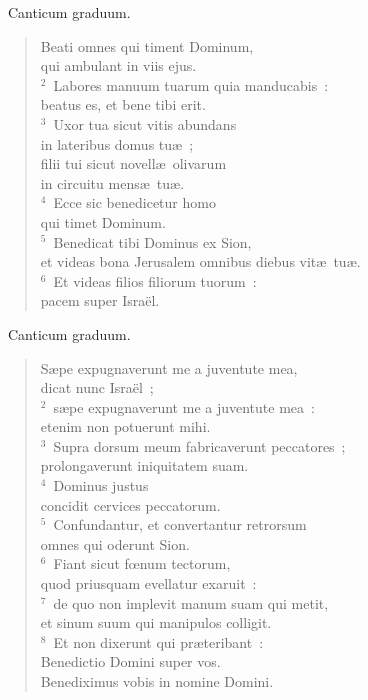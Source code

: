 ~\lettrine[lines=10,image=true,loversize=0.05,lraise=-0.03]{C}{}anticum graduum. \begin{flushleft}\begin{verse}\vspace{6pt}Beati omnes qui timent Dominum,\\ qui ambulant in viis ejus.\\
${}^{2}$~Labores manuum tuarum quia manducabis~:\\ beatus es, et bene tibi erit.\\
${}^{3}$~Uxor tua sicut vitis abundans\\ in lateribus domus tu\ae~;\\ filii tui sicut novell\ae\ olivarum\\ in circuitu mens\ae\ tu\ae .\\
${}^{4}$~Ecce sic benedicetur homo\\ qui timet Dominum.\\
${}^{5}$~Benedicat tibi Dominus ex Sion,\\ et videas bona Jerusalem omnibus diebus vit\ae\ tu\ae .\\
${}^{6}$~Et videas filios filiorum tuorum~:\\ pacem super Isra\"el.\end{verse}\end{flushleft}


~\lettrine[lines=10,image=true,loversize=0.05,lraise=-0.03]{C}{}anticum graduum. \begin{flushleft}\begin{verse}\vspace{6pt}S\ae pe expugnaverunt me a juventute mea,\\ dicat nunc Isra\"el~;\\
${}^{2}$~s\ae pe expugnaverunt me a juventute mea~:\\ etenim non potuerunt mihi.\\
${}^{3}$~Supra dorsum meum fabricaverunt peccatores~;\\ prolongaverunt iniquitatem suam.\\
${}^{4}$~Dominus justus\\ concidit cervices peccatorum.\\
${}^{5}$~Confundantur, et convertantur retrorsum\\ omnes qui oderunt Sion.\\
${}^{6}$~Fiant sicut fœnum tectorum,\\ quod priusquam evellatur exaruit~:\\
${}^{7}$~de quo non implevit manum suam qui metit,\\ et sinum suum qui manipulos colligit.\\
${}^{8}$~Et non dixerunt qui pr\ae teribant~:\\ Benedictio Domini super vos.\\ Benediximus vobis in nomine Domini.\end{verse}\end{flushleft}


